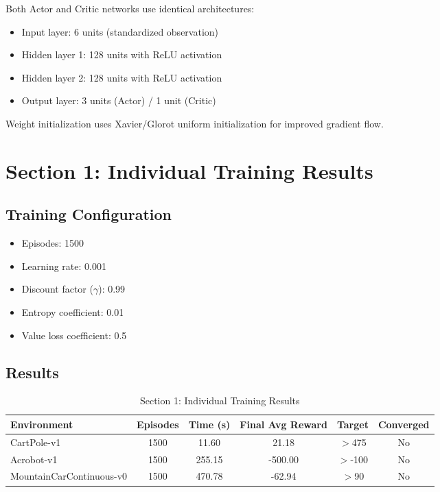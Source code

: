 \documentclass[11pt,a4paper]{article}
\begin{document}
Both Actor and Critic networks use identical architectures:
\begin{itemize}
    \item Input layer: 6 units (standardized observation)
    \item Hidden layer 1: 128 units with ReLU activation
    \item Hidden layer 2: 128 units with ReLU activation
    \item Output layer: 3 units (Actor) / 1 unit (Critic)
\end{itemize}

Weight initialization uses Xavier/Glorot uniform initialization for improved gradient flow.

\section{Section 1: Individual Training Results}

\subsection{Training Configuration}
\begin{itemize}
    \item Episodes: 1500
    \item Learning rate: 0.001
    \item Discount factor ($\gamma$): 0.99
    \item Entropy coefficient: 0.01
    \item Value loss coefficient: 0.5
\end{itemize}

\subsection{Results}

\begin{table}[H]
\centering
\caption{Section 1: Individual Training Results}
\begin{tabular}{lccccc}
\toprule
\textbf{Environment} & \textbf{Episodes} & \textbf{Time (s)} & \textbf{Final Avg Reward} & \textbf{Target} & \textbf{Converged} \\
\midrule
CartPole-v1 & 1500 & 11.60 & 21.18 & $>$475 & No \\
Acrobot-v1 & 1500 & 255.15 & -500.00 & $>$-100 & No \\
MountainCarContinuous-v0 & 1500 & 470.78 & -62.94 & $>$90 & No \\
\bottomrule
\end{tabular}
\end{table}
\end{document}
